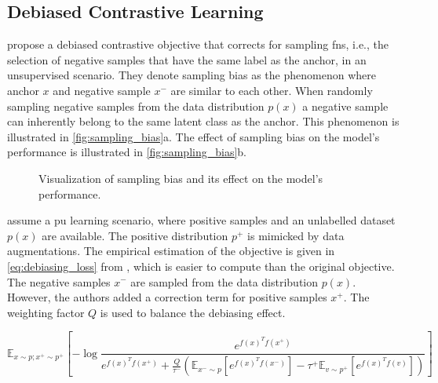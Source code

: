 \subsection{Debiased Contrastive Learning}\label{subsec:debiasing_cl}

\citet{chuang_debiased_2020} propose a debiased contrastive objective that corrects for sampling \acp{fn}, 
i.e., the selection of negative samples that have the same label as the anchor, in an unsupervised scenario.
They denote sampling bias as the phenomenon where anchor $x$ and negative sample $x^-$ are similar to each other.
When randomly sampling negative samples from the data distribution $p(x)$ 
a negative sample can inherently belong to the same latent class as the anchor.
This phenomenon is illustrated in \autoref{fig:sampling_bias}a.
The effect of sampling bias on the model's performance is illustrated in \autoref{fig:sampling_bias}b.

\begin{figure}%
    \centering
    \qquad
    \caption{Visualization of sampling bias and its effect on the model's performance.}%
    \label{fig:sampling_bias}%
\end{figure}

\citeauthor{chuang_debiased_2020} assume a \ac{pu} learning scenario, 
where positive samples and an unlabelled dataset $p(x)$ are available.
The positive distribution $p^+$ is mimicked by data augmentations.
The empirical estimation of the objective is given in 
\autoref{eq:debiasing_loss} from \citet{chuang_debiased_2020},
which is easier to compute than the original objective.
The negative samples $x^-$ are sampled from the data distribution $p(x)$.
However, the authors added a correction term for positive samples $x^+$.
The weighting factor $Q$ is used to balance the debiasing effect.

\begin{equation}
    \mathbb{E}_{x \sim p; x^+ \sim p^+}[{-\log{\frac{e^{f(x)^Tf(x^+)}}{e^{f(x)^Tf(x^+)}+ \frac{Q}{\tau^-}(\mathbb{E}_{x^- \sim p}[e^{f(x)^Tf(x^-)}]-\tau^+\mathbb{E}_{v \sim p^+}[e^{f(x)^Tf(v)}])}}}]
    \label{eq:debiasing_loss}
\end{equation}
